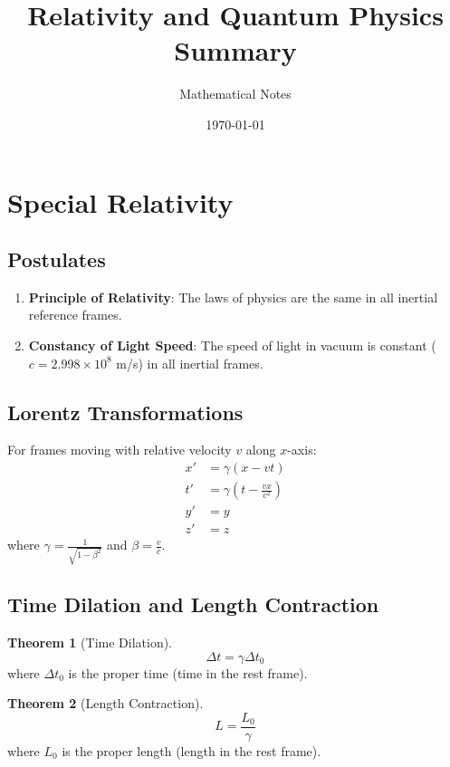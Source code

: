 \documentclass[11pt]{article}
\title{Relativity and Quantum Physics Summary}
\author{Mathematical Notes}
\date{\today}
\theoremstyle{definition}
\newtheorem{theorem}{Theorem}[section]
\begin{document}
\maketitle

\tableofcontents
\newpage

\section{Special Relativity}

\subsection{Postulates}
\begin{enumerate}
    \item \textbf{Principle of Relativity}: The laws of physics are the same in all inertial reference frames.
    \item \textbf{Constancy of Light Speed}: The speed of light in vacuum is constant ($c = 2.998 \times 10^8$ m/s) in all inertial frames.
\end{enumerate}

\subsection{Lorentz Transformations}
For frames moving with relative velocity $v$ along $x$-axis:
\begin{align}
    x' &= \gamma(x - vt) \\
    t' &= \gamma\left(t - \frac{vx}{c^2}\right) \\
    y' &= y \\
    z' &= z
\end{align}
where $\gamma = \frac{1}{\sqrt{1-\beta^2}}$ and $\beta = \frac{v}{c}$.

\subsection{Time Dilation and Length Contraction}
\begin{theorem}[Time Dilation]
$$\Delta t = \gamma \Delta t_0$$
where $\Delta t_0$ is the proper time (time in the rest frame).
\end{theorem}

\begin{theorem}[Length Contraction]
$$L = \frac{L_0}{\gamma}$$
where $L_0$ is the proper length (length in the rest frame).
\end{theorem}
\end{document}
